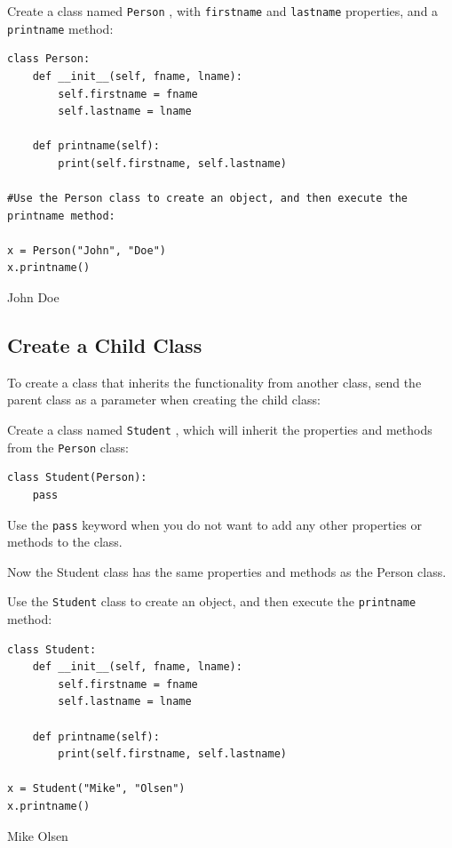 \documentclass[12pt,a4paper]{article}
\newcommand{\lcode}[1]{%
	\lstinline{#1}%
}
\begin{document}
\begin{ebox}
Create a class named \lcode{Person}, with \lcode{firstname} and
\lcode{lastname} properties, and a \lcode{printname} method:
	\begin{lstlisting}
class Person:
    def __init__(self, fname, lname):
        self.firstname = fname
        self.lastname = lname

    def printname(self):
        print(self.firstname, self.lastname)

#Use the Person class to create an object, and then execute the printname method:

x = Person("John", "Doe")
x.printname()
	\end{lstlisting}
\tcblower
	\begin{vercode}
John Doe
	\end{vercode}
\end{ebox}

\subsection{Create a Child Class}

To create a class that inherits the functionality from another class, send the
parent class as a parameter when creating the child class:

\begin{ebox}
Create a class named \lcode{Student}, which will inherit the properties and
methods from the \lcode{Person} class:
	\begin{lstlisting}
class Student(Person):
    pass
	\end{lstlisting}
\end{ebox}

\begin{nbox}
Use the \lcode{pass} keyword when you do not want to add any other properties
or methods to the class.
\end{nbox}

Now the Student class has the same properties and methods as the Person class.

\begin{ebox}
	Use the \lcode{Student} class to create an object, and then execute the \lcode{printname} method:
	\begin{lstlisting}
class Student:
    def __init__(self, fname, lname):
        self.firstname = fname
        self.lastname = lname

    def printname(self):
        print(self.firstname, self.lastname)

x = Student("Mike", "Olsen")
x.printname()
	\end{lstlisting}
\tcblower
	\begin{vercode}
Mike Olsen
	\end{vercode}
\end{ebox}
\end{document}
